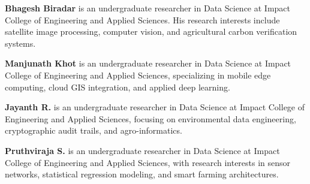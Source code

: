 \documentclass[a4paper,10pt]{article}
\begin{document}
\textbf{Bhagesh Biradar} is an undergraduate researcher in Data Science at Impact College of Engineering and Applied Sciences. His research interests include satellite image processing, computer vision, and agricultural carbon verification systems.

\textbf{Manjunath Khot} is an undergraduate researcher in Data Science at Impact College of Engineering and Applied Sciences, specializing in mobile edge computing, cloud GIS integration, and applied deep learning.

\textbf{Jayanth R.} is an undergraduate researcher in Data Science at Impact College of Engineering and Applied Sciences, focusing on environmental data engineering, cryptographic audit trails, and agro-informatics.

\textbf{Pruthviraja S.} is an undergraduate researcher in Data Science at Impact College of Engineering and Applied Sciences, with research interests in sensor networks, statistical regression modeling, and smart farming architectures.
\end{document}
